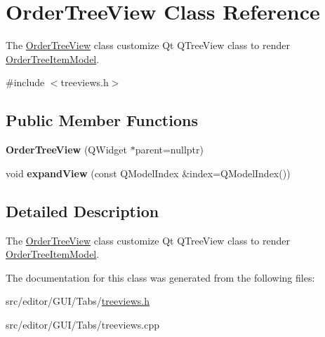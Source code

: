 \hypertarget{class_order_tree_view}{\section{\-Order\-Tree\-View \-Class \-Reference}
\label{class_order_tree_view}
}


\-The \hyperlink{class_order_tree_view}{\-Order\-Tree\-View} class customize \-Qt \-Q\-Tree\-View class to render \hyperlink{class_order_tree_item_model}{\-Order\-Tree\-Item\-Model}.  




{\ttfamily \#include $<$treeviews.\-h$>$}

\subsection*{\-Public \-Member \-Functions}
\begin{DoxyCompactItemize}
\item 
\hypertarget{class_order_tree_view_a1b777f6109a525f0451215fc21c1c34e}{{\bfseries \-Order\-Tree\-View} (\-Q\-Widget $\ast$parent=nullptr)}\label{class_order_tree_view_a1b777f6109a525f0451215fc21c1c34e}

\item 
\hypertarget{class_order_tree_view_ace8b3165271352d2cba83e042596f4b4}{void {\bfseries expand\-View} (const \-Q\-Model\-Index \&index=\-Q\-Model\-Index())}\label{class_order_tree_view_ace8b3165271352d2cba83e042596f4b4}

\end{DoxyCompactItemize}


\subsection{\-Detailed \-Description}
\-The \hyperlink{class_order_tree_view}{\-Order\-Tree\-View} class customize \-Qt \-Q\-Tree\-View class to render \hyperlink{class_order_tree_item_model}{\-Order\-Tree\-Item\-Model}. 

\-The documentation for this class was generated from the following files\-:\begin{DoxyCompactItemize}
\item 
src/editor/\-G\-U\-I/\-Tabs/\hyperlink{treeviews_8h}{treeviews.\-h}\item 
src/editor/\-G\-U\-I/\-Tabs/treeviews.\-cpp\end{DoxyCompactItemize}
